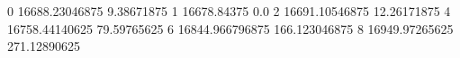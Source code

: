 0 16688.23046875 9.38671875
1 16678.84375 0.0
2 16691.10546875 12.26171875
4 16758.44140625 79.59765625
6 16844.966796875 166.123046875
8 16949.97265625 271.12890625
